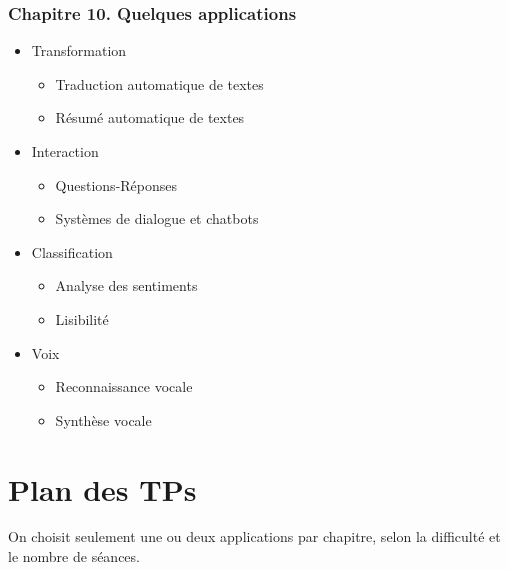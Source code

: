 \documentclass[11pt, a4paper]{article}
\begin{document}
\begin{tcolorbox}
\subsubsection*{Chapitre 10. Quelques applications}

\begin{multicols}{2}
	\begin{itemize}
		\item Transformation
		\begin{itemize}
			\item Traduction automatique de textes
			\item Résumé automatique de textes
		\end{itemize}
		\item Interaction
		\begin{itemize}
			\item Questions-Réponses
			\item Systèmes de dialogue et chatbots
		\end{itemize}
	    \item Classification
	    \begin{itemize}
	    	\item Analyse des sentiments
	    	\item Lisibilité
	    \end{itemize}
    	\item Voix
		\begin{itemize}
			\item Reconnaissance vocale
			\item Synthèse vocale
		\end{itemize}
	\end{itemize}
\end{multicols}
\end{tcolorbox}


\section{Plan des TPs}

On choisit seulement une ou deux applications par chapitre, selon la difficulté et le nombre de séances.
\end{document}
